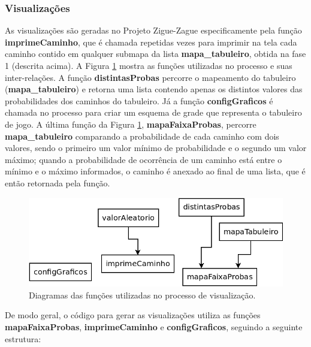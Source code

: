 \documentclass[12pt]{article}
\begin{document}
\subsubsection{Visualizações}

As visualizações são geradas no Projeto Zigue-Zague especificamente pela função \textbf{imprimeCaminho}, que é chamada repetidas vezes para imprimir na tela cada caminho contido em qualquer submapa da lista \textbf{mapa\_tabuleiro}, obtida na fase 1 (descrita acima). A Figura \ref{funcoes_auxiliares_visualizacao} mostra as funções utilizadas no processo e suas inter-relações. A função \textbf{distintasProbas} percorre o mapeamento do tabuleiro (\textbf{mapa\_tabuleiro}) e retorna uma lista contendo apenas os distintos valores das probabilidades dos caminhos do tabuleiro. Já a função \textbf{configGraficos} é chamada no processo para criar um esquema de grade que representa o tabuleiro de jogo. A última função da Figura \ref{funcoes_auxiliares_visualizacao}, \textbf{mapaFaixaProbas}, percorre \textbf{mapa\_tabuleiro} comparando a probabilidade de cada caminho com dois valores, sendo o primeiro um valor mínimo de probabilidade e o segundo um valor máximo; quando a probabilidade de ocorrência de um caminho está entre o mínimo e o máximo informados, o caminho é anexado ao final de uma lista, que é então retornada pela função.

\begin{figure}[ht]
	\centering
	\includegraphics[width=0.8\linewidth]{img/funcoes_auxiliares_visualizacao.png}
	\caption{Diagramas das funções utilizadas no processo de visualização.}
	\label{funcoes_auxiliares_visualizacao}
\end{figure}

De modo geral, o código para gerar as visualizações utiliza as funções \textbf{mapaFaixaProbas}, \textbf{imprimeCaminho} e \textbf{configGraficos}, seguindo a seguinte estrutura: 
\end{document}
